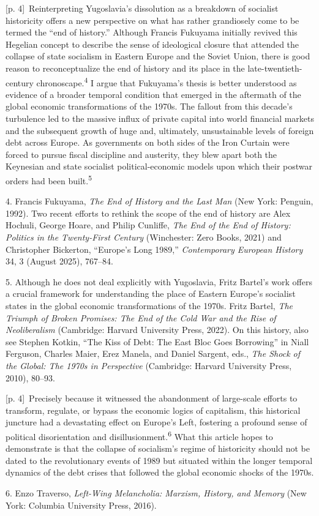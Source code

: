 \documentclass[10pt,a4paper]{article}
\begin{document}
{\scriptsize\color{gray} [p. 4]}\ Reinterpreting Yugoslavia’s dissolution as a breakdown of socialist historicity offers a new perspective on what has rather grandiosely come to be termed the “end of history.” Although Francis Fukuyama initially revived this Hegelian concept to describe the sense of ideological closure that attended the collapse of state socialism in Eastern Europe and the Soviet Union, there is good reason to reconceptualize the end of history and its place in the late-twentieth-century chronoscape.\nobreak\textsuperscript{4} I argue that Fukuyama’s thesis is better understood as evidence of a broader temporal condition that emerged in the aftermath of the global economic transformations of the 1970s. The fallout from this decade’s turbulence led to the massive influx of private capital into world financial markets and the subsequent growth of huge and, ultimately, unsustainable levels of foreign debt across Europe. As governments on both sides of the Iron Curtain were forced to pursue fiscal discipline and austerity, they blew apart both the Keynesian and state socialist political-economic models upon which their postwar orders had been built.\nobreak\textsuperscript{5}\par{\small 4. Francis Fukuyama, \textit{The End of History and the Last Man} (New York: Penguin, 1992). Two recent efforts to rethink the scope of the end of history are Alex Hochuli, George Hoare, and Philip Cunliffe, \textit{The End of the End of History: Politics in the Twenty-First Century} (Winchester: Zero Books, 2021) and Christopher Bickerton, “Europe’s Long 1989,” \textit{Contemporary European History} 34, 3 (August 2025), 767–84.\par}{\small 5. Although he does not deal explicitly with Yugoslavia, Fritz Bartel’s work offers a crucial framework for understanding the place of Eastern Europe’s socialist states in the global economic transformations of the 1970s. Fritz Bartel, \textit{The Triumph of Broken Promises: The End of the Cold War and the Rise of Neoliberalism} (Cambridge: Harvard University Press, 2022). On this history, also see Stephen Kotkin, “The Kiss of Debt: The East Bloc Goes Borrowing” in Niall Ferguson, Charles Maier, Erez Manela, and Daniel Sargent, eds., \textit{The Shock of the Global: The 1970s in Perspective} (Cambridge: Harvard University Press, 2010), 80–93.\par}
{\scriptsize\color{gray} [p. 4]}\ Precisely because it witnessed the abandonment of large-scale efforts to transform, regulate, or bypass the economic logics of capitalism, this historical juncture had a devastating effect on Europe’s Left, fostering a profound sense of political disorientation and disillusionment.\nobreak\textsuperscript{6} What this article hopes to demonstrate is that the collapse of socialism’s regime of historicity should not be dated to the revolutionary events of 1989 but situated within the longer temporal dynamics of the debt crises that followed the global economic shocks of the 1970s.\par{\small 6. Enzo Traverso, \textit{Left-Wing Melancholia: Marxism, History, and Memory} (New York: Columbia University Press, 2016).\par}
\end{document}
